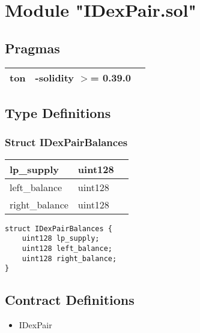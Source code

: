 
\section{Module "IDexPair.sol"}


\subsection{Pragmas}


\noindent\begin{tabular}{|l|l|p{5cm}|}\hline
ton & -solidity $>$= 0.39.0 &\\\hline
\end{tabular}


\subsection{Type Definitions}


\subsubsection{Struct IDexPairBalances}


\ifsoltables
\noindent\begin{tabular}{|l|l|p{6cm}|}\hline
lp\_{}supply & uint128 & \\\hline
left\_{}balance & uint128 & \\\hline
right\_{}balance & uint128 & \\\hline
\end{tabular}
\fi


\begin{lstlisting}[firstnumber=3]
struct IDexPairBalances {
    uint128 lp_supply;
    uint128 left_balance;
    uint128 right_balance;
}
\end{lstlisting}

\subsection{Contract Definitions}

\begin{itemize}
\item IDexPair
\end{itemize}
